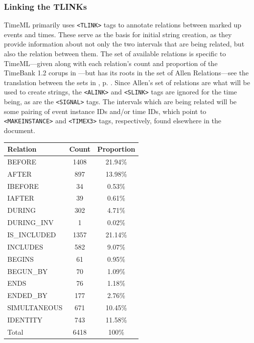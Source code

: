 \documentclass[a4paper,12pt,leqno]{article}
\begin{document}
\subsubsection{Linking the TLINKs}\label{ssub:tlinks}
TimeML primarily uses \verb|<TLINK>| tags to annotate relations between marked up events and times. These serve as the basis for initial string creation, as they provide information about not only the two intervals that are being related, but also the relation between them. The set of available relations is specific to TimeML---given along with each relation's count and proportion of the TimeBank 1.2 corups in ---but has its roots in the set of Allen Relations---see the translation between the sets in , p. \pageref{fig:tlink-allen-translation}. Since Allen's set of relations are what will be used to create strings, the \verb|<ALINK>| and \verb|<SLINK>| tags are ignored for the time being, as are the \verb|<SIGNAL>| tags. The intervals which are being related will be some pairing of event instance IDs and/or time IDs, which point to \verb|<MAKEINSTANCE>| and \verb|<TIMEX3>| tags, respectively, found elsewhere in the document.
\begin{center}
	\begin{tabular}[h!]{| l c c |}
		\hline
		\textbf{Relation} & \textbf{Count} & \textbf{Proportion}\\
		\hline
		BEFORE & 1408 & 21.94\%\\
		AFTER & 897 & 13.98\%\\
		IBEFORE & 34 & 0.53\%\\
		IAFTER & 39 & 0.61\%\\
		DURING & 302 & 4.71\%\\
		DURING\_INV & 1 & 0.02\%\\
		IS\_INCLUDED & 1357 & 21.14\%\\
		INCLUDES & 582 & 9.07\%\\
		BEGINS & 61 & 0.95\%\\
		BEGUN\_BY & 70 & 1.09\%\\
		ENDS & 76 & 1.18\%\\
		ENDED\_BY & 177 & 2.76\%\\
		SIMULTANEOUS & 671 & 10.45\%\\
		IDENTITY & 743 & 11.58\%\\
		\hline
		Total & 6418 & 100\%\\
		\hline
	\end{tabular}
	\label{tab:timeml-relation-counts}
\end{center}
\end{document}
